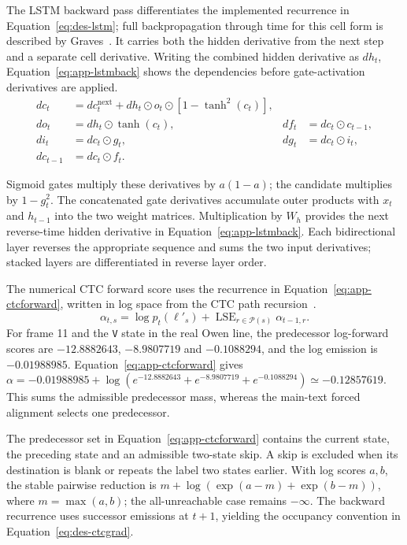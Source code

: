 The LSTM backward pass differentiates the implemented recurrence in Equation~\ref{eq:des-lstm}; full backpropagation through time for this cell form is described by Graves~\cite[pp.~4--5]{graves2013}. It carries both the hidden derivative from the next step and a separate cell derivative. Writing the combined hidden derivative as $d h_t$, Equation~\ref{eq:app-lstmback} shows the dependencies before gate-activation derivatives are applied.
\begin{equation}
\begin{aligned}
d c_t&=d c_t^{\mathrm{next}}+d h_t\odot o_t\odot[1-\tanh^2(c_t)],\\
d o_t&=d h_t\odot\tanh(c_t),& d f_t&=d c_t\odot c_{t-1},\\
d i_t&=d c_t\odot g_t,&d g_t&=d c_t\odot i_t,\\
d c_{t-1}&=d c_t\odot f_t.
\end{aligned}
\label{eq:app-lstmback}
\end{equation}

Sigmoid gates multiply these derivatives by $a(1-a)$; the candidate multiplies by $1-g_t^2$. The concatenated gate derivatives accumulate outer products with $x_t$ and $h_{t-1}$ into the two weight matrices. Multiplication by $W_h$ provides the next reverse-time hidden derivative in Equation~\ref{eq:app-lstmback}. Each bidirectional layer reverses the appropriate sequence and sums the two input derivatives; stacked layers are differentiated in reverse layer order.

The numerical CTC forward score uses the recurrence in Equation~\ref{eq:app-ctcforward}, written in log space from the CTC path recursion~\cite[p.~4]{graves2006}.
\begin{equation}
\alpha_{t,s}=\log p_t(\ell'_s)+
\operatorname{LSE}_{r\in\mathcal P(s)}\alpha_{t-1,r}.
\label{eq:app-ctcforward}
\end{equation}
For frame 11 and the \texttt{V} state in the real Owen line, the predecessor log-forward scores are $-12.8882643$, $-8.9807719$ and $-0.1088294$, and the log emission is $-0.01988985$. Equation~\ref{eq:app-ctcforward} gives $\alpha=-0.01988985+\log(e^{-12.8882643}+e^{-8.9807719}+e^{-0.1088294})\simeq-0.12857619$. This sums the admissible predecessor mass, whereas the main-text forced alignment selects one predecessor.

The predecessor set in Equation~\ref{eq:app-ctcforward} contains the current state, the preceding state and an admissible two-state skip. A skip is excluded when its destination is blank or repeats the label two states earlier. With log scores $a,b$, the stable pairwise reduction is $m+\log(\exp(a-m)+\exp(b-m))$, where $m=\max(a,b)$; the all-unreachable case remains $-\infty$. The backward recurrence uses successor emissions at $t+1$, yielding the occupancy convention in Equation~\ref{eq:des-ctcgrad}.

